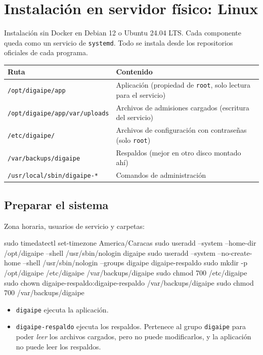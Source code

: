 \chapter{Instalación en servidor físico: Linux}
\label{cap:linux}

Instalación sin Docker en Debian 12 o Ubuntu 24.04 LTS. Cada componente queda como un servicio
de \texttt{systemd}. Todo se instala desde los repositorios oficiales de cada programa.

\begin{xltabular}{\linewidth}{@{}l L@{}}
	\toprule
	\textbf{Ruta} & \textbf{Contenido} \\
	\midrule
	\endhead
	\texttt{/opt/digaipe/app} & Aplicación (propiedad de \texttt{root}, solo lectura para el
	servicio) \\
	\texttt{/opt/digaipe/app/var/uploads} & Archivos de admisiones cargados (escritura del
	servicio) \\
	\texttt{/etc/digaipe/} & Archivos de configuración con contraseñas (solo \texttt{root}) \\
	\texttt{/var/backups/digaipe} & Respaldos (mejor en otro disco montado ahí) \\
	\texttt{/usr/local/sbin/digaipe-*} & Comandos de administración \\
	\bottomrule
\end{xltabular}

\section{Preparar el sistema}

Zona horaria, usuarios de servicio y carpetas:

\begin{codigo}
sudo timedatectl set-timezone America/Caracas
sudo useradd --system --home-dir /opt/digaipe --shell /usr/sbin/nologin digaipe
sudo useradd --system --no-create-home --shell /usr/sbin/nologin --groups digaipe digaipe-respaldo
sudo mkdir -p /opt/digaipe /etc/digaipe /var/backups/digaipe
sudo chmod 700 /etc/digaipe
sudo chown digaipe-respaldo:digaipe-respaldo /var/backups/digaipe
sudo chmod 700 /var/backups/digaipe
\end{codigo}

\begin{itemize}
	\item \texttt{digaipe} ejecuta la aplicación.
	\item \texttt{digaipe-respaldo} ejecuta los respaldos. Pertenece al grupo \texttt{digaipe} para
	      poder \emph{leer} los archivos cargados, pero no puede modificarlos, y la aplicación no
	      puede leer los respaldos.
\end{itemize}

